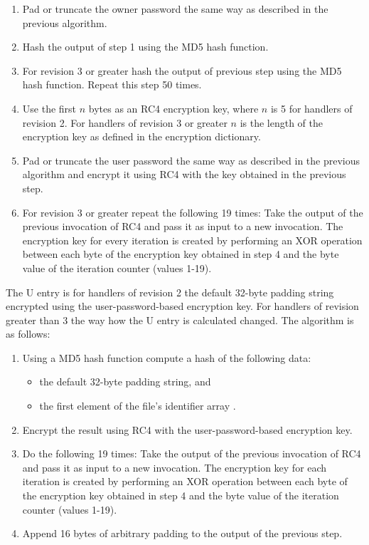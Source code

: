 \documentclass[11pt,oneside]{fithesis2}
\begin{document}
\begin{enumerate}
\setlength\itemsep{0.1em}
\item{Pad or truncate the owner password the same way as described in the previous algorithm.}
\item{Hash the output of step 1 using the MD5 hash function.}
\item{For revision 3 or greater hash the output of previous step using the MD5 hash function. Repeat this step 50 times.}
\item{Use the first $n$ bytes as an RC4 encryption key, where $n$ is 5 for handlers of revision 2. For handlers of revision 3 or greater $n$ is the length of the encryption key as defined in the encryption dictionary.}
\item{Pad or truncate the user password the same way as described in the previous algorithm and encrypt it using RC4 with the key obtained in the previous step.}
\item{For revision 3 or greater repeat the following 19 times: Take the output of the previous invocation of RC4 and pass it as input to a new invocation. The encryption key for every iteration is created by performing an XOR operation between each byte of the encryption key obtained in step 4 and the byte value of the iteration counter (values 1-19).}
\end{enumerate}

The U entry is for handlers of revision 2 the default 32-byte padding string encrypted using the user-password-based encryption key. For handlers of revision greater than 3 the way how the U entry is calculated changed. The algorithm is as follows:

\begin{enumerate}
\setlength\itemsep{0.1em}
\item{Using a MD5 hash function compute a hash of the following data:}
\begin{itemize}
		\item{the default 32-byte padding string, and}
		\item{the first element of the file's identifier array \cite[p. 43]{pdf_spec}.}
\end{itemize}
\item{Encrypt the result using RC4 with the user-password-based encryption key.}
\item{Do the following 19 times: Take the output of the previous invocation of RC4 and pass it as input to a new invocation. The encryption key for each iteration is created by performing an XOR operation between each byte of the encryption key obtained in step 4 and the byte value of the iteration counter (values 1-19).}
\item{Append 16 bytes of arbitrary padding to the output of the previous step.}
\end{enumerate}
\end{document}
